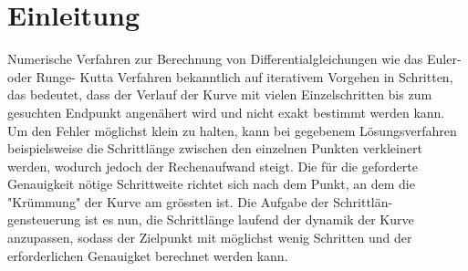 %
%
%
\section{Einleitung\label{steps:section:einleitung}}

Numerische Verfahren zur Berechnung von Differentialgleichungen wie das Euler- oder Runge-
Kutta Verfahren bekanntlich auf iterativem Vorgehen in Schritten, das bedeutet, dass der Verlauf
der Kurve mit vielen Einzelschritten bis zum gesuchten Endpunkt angenähert wird und nicht exakt
bestimmt werden kann. Um den Fehler möglichst klein zu halten,
kann bei gegebenem Lösungsverfahren beispielsweise die Schrittlänge zwischen den einzelnen Punkten verkleinert werden, wodurch
jedoch der Rechenaufwand steigt. Die für die geforderte Genauigkeit nötige Schrittweite richtet sich
nach dem Punkt, an dem die "Krümmung" der Kurve am grössten ist. Die Aufgabe der Schrittlän-
gensteuerung ist es nun, die Schrittlänge laufend der dynamik der Kurve anzupassen, sodass der
Zielpunkt mit möglichst wenig Schritten und der erforderlichen Genauigket berechnet werden
kann.

